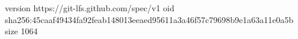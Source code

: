 version https://git-lfs.github.com/spec/v1
oid sha256:45caaf49434fa92feab148013eeaed95611a3a46f57c79698b9e1a63a11e0a5b
size 1064
